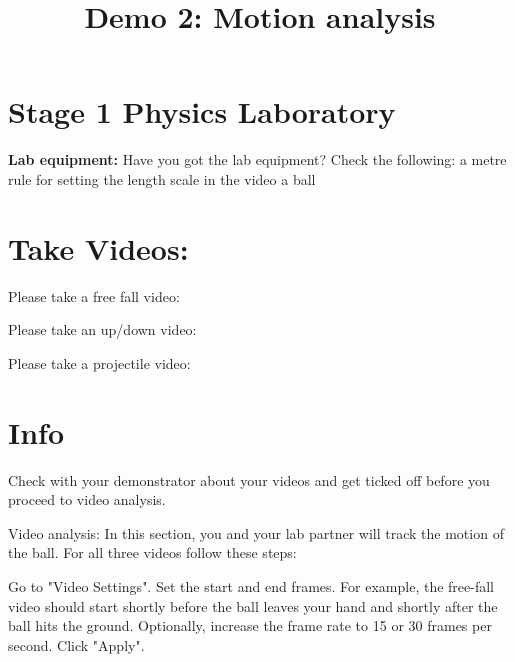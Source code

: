 \documentclass{article}
\begin{document}
\title{Demo 2: Motion analysis}

\maketitle

\section{Stage 1 Physics Laboratory}
	\textbf{Lab equipment:}
	Have you got the lab equipment? Check the following:
	a metre rule for setting the length scale in the video
	a ball

\section{Take Videos:}
    Please take a free fall video:

    Please take an up/down video:

    Please take a projectile video:

\section{Info}
	Check with your demonstrator about your videos and get ticked off before
	you proceed to video analysis.

	Video analysis: In this section, you and your lab partner will track the
    motion of the ball. For all three videos follow these steps:

	Go to "Video Settings". Set the start and end frames.  For example, the
	free-fall video should start shortly before the ball leaves your hand and
	shortly after the ball hits the ground. Optionally, increase the frame
	rate to 15 or 30 frames per second. Click "Apply".

	Now drag the green length scale to fit your length reference. Click on
    "Calibration" and set scale. Click "Apply".

	You can now tag the positions of the ball from the initial position to the
    final position. Find the cross-hair with green rings, drag it by the outer ring
    to tag the ball and advance to the next frame. Repeat until you have finished
    tagging. Click “Done” to analyse other videos (e.g. vertical linear motion and
    projectile motion).
\end{document}
